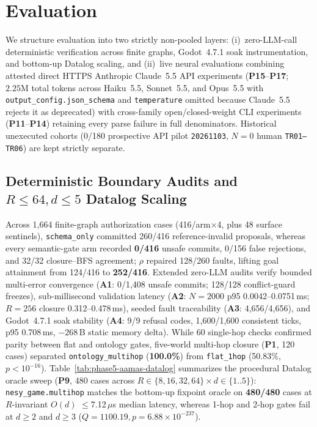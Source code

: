 \section{Evaluation}\label{sec:eval}
We structure evaluation into two strictly non-pooled layers: (i)~zero-LLM-call deterministic verification across finite graphs, Godot~4.7.1 soak instrumentation, and bottom-up Datalog scaling, and (ii)~live neural evaluations combining attested direct HTTPS Anthropic Claude~5.5 API experiments (\textbf{P15}--\textbf{P17}; $2.25\text{M}$ total tokens across Haiku~5.5, Sonnet~5.5, and Opus~5.5 with \texttt{output\_config.json\_schema} and \texttt{temperature} omitted because Claude~5.5 rejects it as deprecated) with cross-family open/closed-weight CLI experiments (\textbf{P11}--\textbf{P14}) retaining every parse failure in full denominators. Historical unexecuted cohorts (0/180 prospective API pilot \texttt{20261103}, $N{=}0$ human \texttt{TR01--TR06}) are kept strictly separate.

\subsection{Deterministic Boundary Audits and $R{\le}64, d{\le}5$ Datalog Scaling}
Across 1,664 finite-graph authorization cases (416/arm$\times$4, plus 48 surface sentinels), \texttt{schema\_only} committed 260/416 reference-invalid proposals, whereas every semantic-gate arm recorded \textbf{0/416} unsafe commits, 0/156 false rejections, and 32/32 closure--BFS agreement; $\rho$ repaired 128/260 faults, lifting goal attainment from 124/416 to \textbf{252/416}. Extended zero-LLM audits verify bounded multi-error convergence (\textbf{A1}: 0/1,408 unsafe commits; 128/128 conflict-guard freezes), sub-millisecond validation latency (\textbf{A2}: $N{=}2000$ p95 0.0042--0.0751\,ms; $R{=}256$ closure 0.312--0.478\,ms), seeded fault traceability (\textbf{A3}: 4,656/4,656), and Godot~4.7.1 soak stability (\textbf{A4}: 9/9 refusal codes, 1,600/1,600 consistent ticks, p95 0.708\,ms, $-268$\,B static memory delta). While 60 single-hop checks confirmed parity between flat and ontology gates, five-world multi-hop closure (\textbf{P1}, 120 cases) separated \texttt{ontology\_\allowbreak multihop} (\textbf{100.0\%}) from \texttt{flat\_1hop} (50.83\%, $p{<}10^{-16}$). Table~\ref{tab:phase5-aamas-datalog} summarizes the procedural Datalog oracle sweep (\textbf{P9}, 480 cases across $R\in\{8,16,32,64\} \times d\in\{1..5\}$): \texttt{nesy\_game.multihop} matches the bottom-up fixpoint oracle on \textbf{480/480} cases at $R$-invariant $O(d)$ $\le$7.12\,$\mu$s median latency, whereas 1-hop and 2-hop gates fail at $d{\ge}2$ and $d{\ge}3$ ($Q{=}1100.19, p{=}6.88{\times}10^{-237}$).

